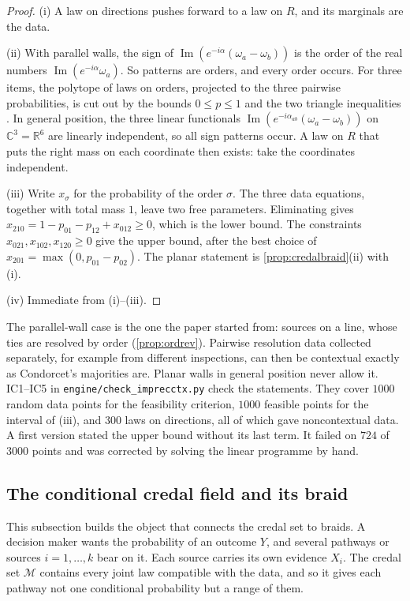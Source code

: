\documentclass[11pt]{article}
\theoremstyle{definition}\newtheorem{definition}[theorem]{Definition}\newtheorem{remark}[theorem]{Remark}\newtheorem{example}[theorem]{Example}\newtheorem{problem}[theorem]{Open problem}\crefname{problem}{Problem}{Problems}
\begin{document}
\begin{proof}
(i) A law on directions pushes forward to a law on $R$, and its marginals are the data.

(ii) With parallel walls, the sign of $\operatorname{Im}(e^{-i\alpha}(\omega_a-\omega_b))$ is the order of the real numbers $\operatorname{Im}(e^{-i\alpha}\omega_a)$. So patterns are orders, and every order occurs. For three items, the polytope of laws on orders, projected to the three pairwise probabilities, is cut out by the bounds $0\le p\le1$ and the two triangle inequalities \cite{GrotschelJungerReinelt1985}. In general position, the three linear functionals $\operatorname{Im}(e^{-i\alpha_{ab}}(\omega_a-\omega_b))$ on $\mathbb C^3=\mathbb R^6$ are linearly independent, so all sign patterns occur. A law on $R$ that puts the right mass on each coordinate then exists: take the coordinates independent.

(iii) Write $x_\sigma$ for the probability of the order $\sigma$. The three data equations, together with total mass $1$, leave two free parameters. Eliminating gives $x_{210}=1-p_{01}-p_{12}+x_{012}\ge0$, which is the lower bound. The constraints $x_{021},x_{102},x_{120}\ge0$ give the upper bound, after the best choice of $x_{201}=\max(0,p_{01}-p_{02})$. The planar statement is \cref{prop:credalbraid}(ii) with (i).

(iv) Immediate from (i)--(iii).
\end{proof}

The parallel-wall case is the one the paper started from: sources on a line, whose ties are resolved by order (\cref{prop:ordrev}). Pairwise resolution data collected separately, for example from different inspections, can then be contextual exactly as Condorcet's majorities are. Planar walls in general position never allow it. IC1--IC5 in \texttt{engine/check\_imprecctx.py} check the statements. They cover $1000$ random data points for the feasibility criterion, $1000$ feasible points for the interval of (iii), and $300$ laws on directions, all of which gave noncontextual data. A first version stated the upper bound without its last term. It failed on $724$ of $3000$ points and was corrected by solving the linear programme by hand.

\subsection{The conditional credal field and its braid}\label{sec:credalfield}
This subsection builds the object that connects the credal set to braids. A decision maker wants the probability of an outcome $Y$, and several pathways or sources $i=1,\dots,k$ bear on it. Each source carries its own evidence $X_i$. The credal set $\mathcal M$ contains every joint law compatible with the data, and so it gives each pathway not one conditional probability but a range of them.
\end{document}
